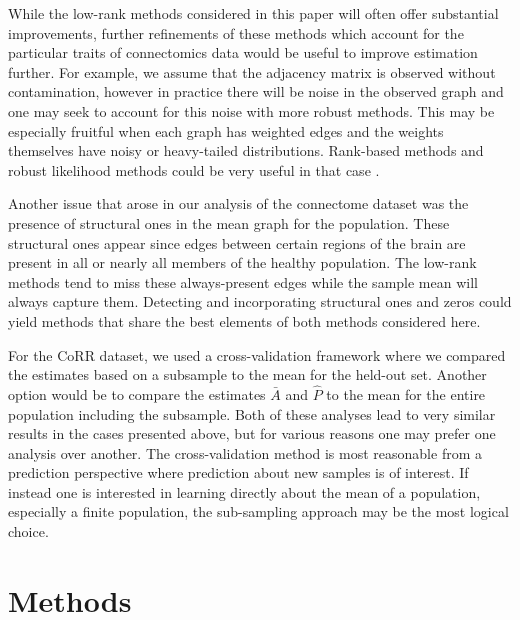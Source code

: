 \documentclass[10pt,letterpaper]{article}
\renewcommand{\hat}{\widehat}
\begin{document}
While the low-rank methods considered in this paper will often offer substantial improvements, further refinements of these methods which account for the particular traits of connectomics data would be useful to improve estimation further.
For example, we assume that the adjacency matrix is observed without contamination, however in practice there will be noise in the observed graph and one may seek to account for this noise with more robust methods.
This may be especially fruitful when each graph has weighted edges and the weights themselves have noisy or heavy-tailed distributions.
Rank-based methods and robust likelihood methods could be very useful in that case \cite{huber2009robust,qin2013maximum}. 


Another issue that arose in our analysis of the connectome dataset was the presence of structural ones in the mean graph for the population. 
These structural ones appear since edges between certain regions of the brain are present in all or nearly all members of the healthy population. 
The low-rank methods tend to miss these always-present edges while the sample mean will always capture them.
Detecting and incorporating structural ones and zeros could yield methods that share the best elements of both methods considered here.

For the CoRR dataset, we used a cross-validation framework where we compared the estimates based on a subsample to the mean for the held-out set. 
Another option would be to compare the estimates $\bar{A}$ and $\hat{P}$ to the mean for the entire population including the subsample.
Both of these analyses lead to very similar results in the cases presented above, but for various reasons one may prefer one analysis over another.
The cross-validation method is most reasonable from a prediction perspective where prediction about new samples is of interest.
If instead one is interested in learning directly about the mean of a population, especially a finite population, the sub-sampling approach may be the most logical choice.

\section{Methods}
\label{sec:method}
\end{document}

